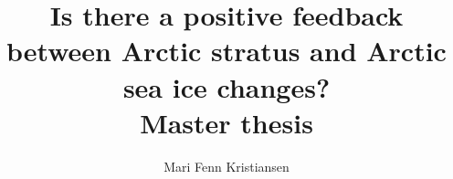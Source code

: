 \documentclass[11pt]{book}
\begin{document}
\title{Is there a positive feedback between Arctic stratus and Arctic sea ice changes?\\Master thesis}
\author{Mari Fenn Kristiansen}
\date{}

\maketitle
\frontmatter


\tableofcontents


\mainmatter

\backmatter


\end{document}
